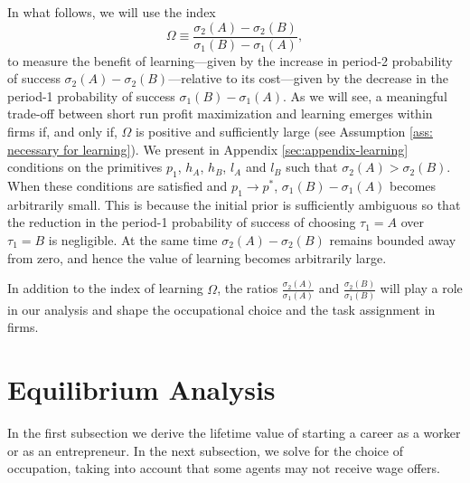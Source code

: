 \documentclass[12pt,american]{paper}
\theoremstyle{remark}
\begin{document}
In what follows, we will use the index
\[
\Omega \equiv \frac{\sigma_2(A)-\sigma_2(B)}{\sigma_1(B)-\sigma_1(A)},
\]
to measure the benefit of learning---given by the increase in period-2 probability of success $\sigma_2(A)-\sigma_2(B)$---relative to its cost---given by the decrease in the period-1 probability of success $\sigma_1(B)-\sigma_1(A)$. As we will see, a meaningful trade-off between short run profit maximization and learning emerges within firms if, and only if, $\Omega$ is positive and sufficiently large (see Assumption \ref{ass: necessary for learning}). We present in Appendix  \ref{sec:appendix-learning}  conditions on the primitives $p_1$, $h_A$, $h_B$, $l_A$ and $l_B$ such that $\sigma_2(A)>\sigma_2(B)$. When these conditions are satisfied and $p_1\rightarrow p^*$,  $\sigma_1(B)-\sigma_1(A)$ becomes arbitrarily small. This is because the initial prior is sufficiently ambiguous so that the reduction in the period-1 probability of success of choosing $\tau_1=A$ over $\tau_1=B$ is negligible. At the same time $\sigma_2(A)-\sigma_2(B)$ remains bounded away from zero, and hence the value of learning becomes arbitrarily large.

In addition to the index of learning $\Omega$, the ratios $\frac{\sigma_2(A)}{\sigma_1(A)}$ and $\frac{\sigma_2(B)}{\sigma_1(B)}$ will play a role in our analysis and shape the occupational choice and the task assignment in firms.








\section{Equilibrium Analysis}\label{sec:equilibrium}
In the first subsection we derive the lifetime value of starting a career as a worker or as an entrepreneur.  In the next subsection, we solve for the choice of occupation, taking into account that some agents may not receive wage offers.
\end{document}
